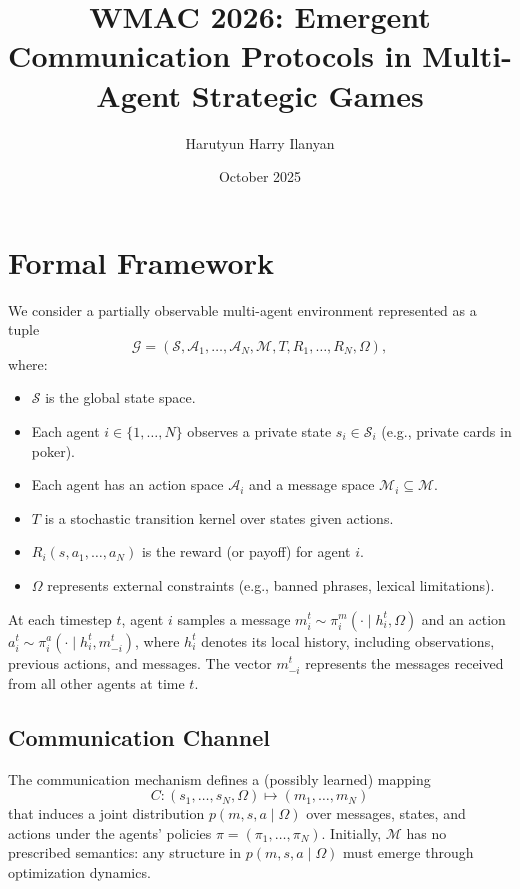\documentclass{article}
\title{WMAC 2026: Emergent Communication Protocols in Multi-Agent Strategic Games}
\author{Harutyun Harry Ilanyan}
\date{October 2025}
\begin{document}
\maketitle

\section{Formal Framework}

We consider a partially observable multi-agent environment represented as a tuple 
\[
\mathcal{G} = (\mathcal{S}, \mathcal{A}_1, \ldots, \mathcal{A}_N, \mathcal{M}, T, R_1, \ldots, R_N, \Omega),
\]
where:
\begin{itemize}
    \item $\mathcal{S}$ is the global state space.
    \item Each agent $i \in \{1,\ldots,N\}$ observes a private state $s_i \in \mathcal{S}_i$ (e.g., private cards in poker).
    \item Each agent has an action space $\mathcal{A}_i$ and a message space $\mathcal{M}_i \subseteq \mathcal{M}$.
    \item $T$ is a stochastic transition kernel over states given actions.
    \item $R_i(s, a_1, \ldots, a_N)$ is the reward (or payoff) for agent $i$.
    \item $\Omega$ represents external constraints (e.g., banned phrases, lexical limitations).
\end{itemize}

At each timestep $t$, agent $i$ samples a message $m_i^t \sim \pi_i^m(\cdot \mid h_i^t, \Omega)$ and an action 
$a_i^t \sim \pi_i^a(\cdot \mid h_i^t, m_{-i}^t)$,
where $h_i^t$ denotes its local history, including observations, previous actions, and messages.  
The vector $m_{-i}^t$ represents the messages received from all other agents at time $t$.

\subsection{Communication Channel}
The communication mechanism defines a (possibly learned) mapping
\[
C: (s_1, \ldots, s_N, \Omega) \mapsto (m_1, \ldots, m_N)
\]
that induces a joint distribution $p(m, s, a \mid \Omega)$ over messages, states, and actions under the agents' policies $\pi = (\pi_1, \ldots, \pi_N)$.
Initially, $\mathcal{M}$ has no prescribed semantics: any structure in $p(m, s, a \mid \Omega)$ must emerge through optimization dynamics.
\end{document}

